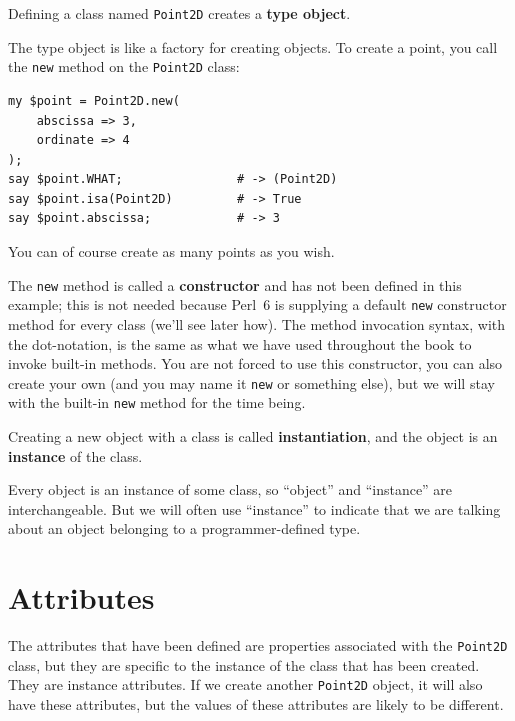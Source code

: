 Defining a class named {\tt Point2D} creates a {\bf type object}.

The type object is like a factory for creating objects.  To create 
a point, you call the {\tt new} method on the {\tt Point2D} class:

\begin{verbatim}
my $point = Point2D.new( 
    abscissa => 3, 
    ordinate => 4
);
say $point.WHAT;                # -> (Point2D)
say $point.isa(Point2D)         # -> True
say $point.abscissa;            # -> 3
\end{verbatim}
%
You can of course create as many points as you wish.

The {\tt new} method is called a {\bf constructor} and has not 
been defined in this example; this is not needed because 
Perl~6 is supplying a default {\tt new} constructor method for 
every class (we'll see later how). The method invocation 
syntax, with the dot-notation, is the same as what we have 
used throughout the book to invoke built-in methods. You 
are not forced to use this constructor, you can also create 
your own (and you may name it {\tt new} or something else), 
but we will stay with the built-in {\tt new} method for the 
time being.

Creating a new object with a class is called {\bf instantiation}, 
and the object is an {\bf instance} of the class.

Every object is an instance of some class, so ``object'' and
``instance'' are interchangeable.  But we will often use
``instance'' to indicate that we are talking about an 
object belonging to a programmer-defined type.

\section{Attributes}
\label{attributes}

The attributes that have been defined are properties associated 
with the {\tt Point2D} class, but they are specific to the 
instance of the class that has been created. They are 
instance attributes. If we create another {\tt Point2D} object, 
it will also have these attributes, but the values of 
these attributes are likely to be different. 

